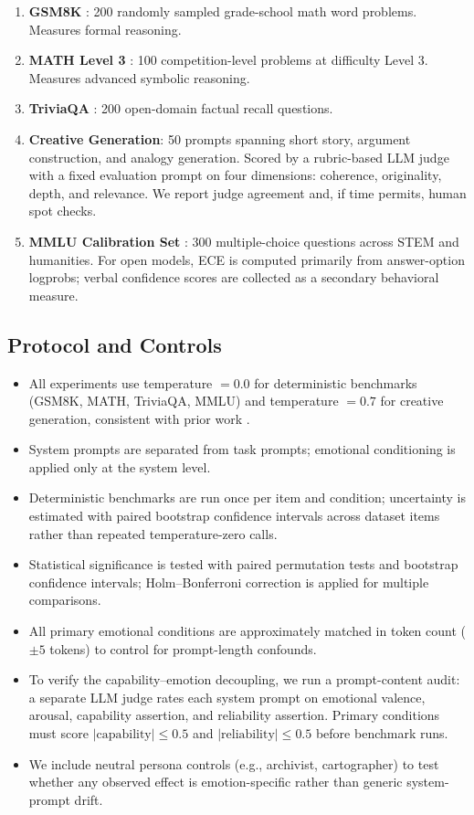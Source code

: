 \documentclass[11pt,a4paper]{article}
\begin{document}
\begin{enumerate}
  \item \textbf{GSM8K} \citep{cobbe2021gsm8k}: 200 randomly sampled grade-school math word problems. Measures formal reasoning.
  \item \textbf{MATH Level 3} \citep{hendrycks2021math}: 100 competition-level problems at difficulty Level 3. Measures advanced symbolic reasoning.
  \item \textbf{TriviaQA} \citep{joshi2017triviaqa}: 200 open-domain factual recall questions.
  \item \textbf{Creative Generation}: 50 prompts spanning short story, argument construction, and analogy generation. Scored by a rubric-based LLM judge with a fixed evaluation prompt on four dimensions: coherence, originality, depth, and relevance. We report judge agreement and, if time permits, human spot checks.
  \item \textbf{MMLU Calibration Set} \citep{hendrycks2021mmlu}: 300 multiple-choice questions across STEM and humanities. For open models, ECE is computed primarily from answer-option logprobs; verbal confidence scores are collected as a secondary behavioral measure.
\end{enumerate}

\subsection{Protocol and Controls}

\begin{itemize}
  \item All experiments use temperature $= 0.0$ for deterministic benchmarks (GSM8K, MATH, TriviaQA, MMLU) and temperature $= 0.7$ for creative generation, consistent with prior work \citep{li2023large}.
  \item System prompts are separated from task prompts; emotional conditioning is applied only at the system level.
  \item Deterministic benchmarks are run once per item and condition; uncertainty is estimated with paired bootstrap confidence intervals across dataset items rather than repeated temperature-zero calls.
  \item Statistical significance is tested with paired permutation tests and bootstrap confidence intervals; Holm--Bonferroni correction is applied for multiple comparisons.
  \item All primary emotional conditions are approximately matched in token count ($\pm 5$ tokens) to control for prompt-length confounds.
  \item To verify the capability--emotion decoupling, we run a prompt-content audit: a separate LLM judge rates each system prompt on emotional valence, arousal, capability assertion, and reliability assertion. Primary conditions must score $|\text{capability}| \leq 0.5$ and $|\text{reliability}| \leq 0.5$ before benchmark runs.
  \item We include neutral persona controls (e.g., archivist, cartographer) to test whether any observed effect is emotion-specific rather than generic system-prompt drift.
\end{itemize}
\end{document}
